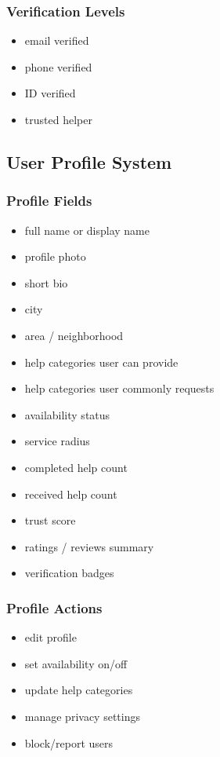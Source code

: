 \documentclass[11pt]{article}
\begin{document}
\subsubsection{Verification Levels}
\begin{itemize}[leftmargin=1.5em]
    \item email verified
    \item phone verified
    \item ID verified
    \item trusted helper
\end{itemize}

\subsection{User Profile System}

\subsubsection{Profile Fields}
\begin{itemize}[leftmargin=1.5em]
    \item full name or display name
    \item profile photo
    \item short bio
    \item city
    \item area / neighborhood
    \item help categories user can provide
    \item help categories user commonly requests
    \item availability status
    \item service radius
    \item completed help count
    \item received help count
    \item trust score
    \item ratings / reviews summary
    \item verification badges
\end{itemize}

\subsubsection{Profile Actions}
\begin{itemize}[leftmargin=1.5em]
    \item edit profile
    \item set availability on/off
    \item update help categories
    \item manage privacy settings
    \item block/report users
\end{itemize}
\end{document}
